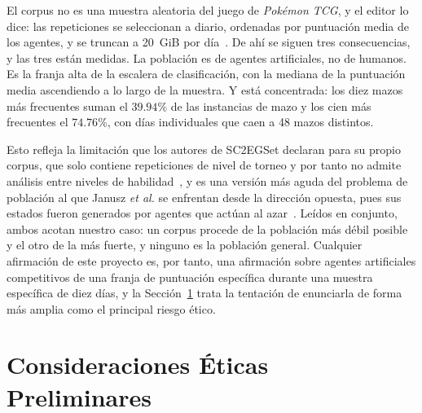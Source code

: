 \documentclass[conference]{IEEEtran}
\begin{document}
El corpus no es una muestra aleatoria del juego de \emph{Pok\'emon TCG}, y
el editor lo dice: las repeticiones se seleccionan a diario, ordenadas por
puntuaci\'on media de los agentes, y se truncan a 20~GiB por
d\'ia~\cite{ptcg_dataset_2026}. De ah\'i se siguen tres consecuencias, y las
tres est\'an medidas. La poblaci\'on es de agentes artificiales, no de
humanos. Es la franja alta de la escalera de clasificaci\'on, con la mediana
de la puntuaci\'on media ascendiendo a lo largo de la muestra. Y est\'a
concentrada: los diez mazos m\'as frecuentes suman el $39.94\%$ de las
instancias de mazo y los cien m\'as frecuentes el $74.76\%$, con d\'ias
individuales que caen a 48 mazos distintos.

Esto refleja la limitaci\'on que los autores de SC2EGSet declaran para su
propio corpus, que solo contiene repeticiones de nivel de torneo y por tanto
no admite an\'alisis entre niveles de habilidad~\cite{bialecki_sc2egset_2023},
y es una versi\'on m\'as aguda del problema de poblaci\'on al que Janusz
\textit{et al.} se enfrentan desde la direcci\'on opuesta, pues sus estados
fueron generados por agentes que act\'uan al
azar~\cite{janusz_hearthstone_2017}. Le\'idos en conjunto, ambos acotan
nuestro caso: un corpus procede de la poblaci\'on m\'as d\'ebil posible y el
otro de la m\'as fuerte, y ninguno es la poblaci\'on general. Cualquier
afirmaci\'on de este proyecto es, por tanto, una afirmaci\'on sobre agentes
artificiales competitivos de una franja de puntuaci\'on espec\'ifica durante
una muestra espec\'ifica de diez d\'ias, y la Secci\'on~\ref{sec:ethics}
trata la tentaci\'on de enunciarla de forma m\'as amplia como el principal
riesgo \'etico.

\section{Consideraciones \'Eticas Preliminares}
\label{sec:ethics}
\end{document}
